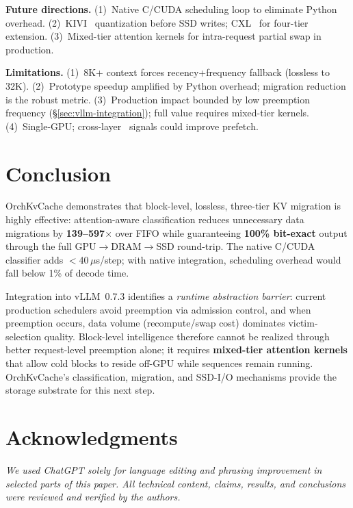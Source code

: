 \documentclass[conference]{IEEEtran}
\begin{document}
\textbf{Future directions.}
(1)~Native C/CUDA scheduling loop to eliminate Python overhead.
(2)~KIVI~\cite{kivi} quantization before SSD writes; CXL~\cite{tpp} for four-tier extension.
(3)~Mixed-tier attention kernels for intra-request partial swap in production.

\textbf{Limitations.}
(1)~8K+ context forces recency+frequency fallback (lossless to 32K).
(2)~Prototype speedup amplified by Python overhead; migration reduction is the robust metric.
(3)~Production impact bounded by low preemption frequency (\S\ref{sec:vllm-integration}); full value requires mixed-tier kernels.
(4)~Single-GPU; cross-layer~\cite{infinigen} signals could improve prefetch.

\section{Conclusion}

OrchKvCache demonstrates that block-level, lossless, three-tier KV migration is highly effective: attention-aware classification reduces unnecessary data migrations by \textbf{139--597$\times$} over FIFO while guaranteeing \textbf{100\% bit-exact} output through the full GPU$\to$DRAM$\to$SSD round-trip. The native C/CUDA classifier adds $<$40\,$\mu$s/step; with native integration, scheduling overhead would fall below 1\% of decode time.

Integration into vLLM~0.7.3 identifies a \emph{runtime abstraction barrier}: current production schedulers avoid preemption via admission control, and when preemption occurs, data volume (recompute/swap cost) dominates victim-selection quality. Block-level intelligence therefore cannot be realized through better request-level preemption alone; it requires \textbf{mixed-tier attention kernels} that allow cold blocks to reside off-GPU while sequences remain running. OrchKvCache's classification, migration, and SSD-I/O mechanisms provide the storage substrate for this next step.

\section*{Acknowledgments}
\textit{We used ChatGPT solely for language editing and phrasing improvement in selected parts of this paper. All technical content, claims, results, and conclusions were reviewed and verified by the authors.}
\end{document}
